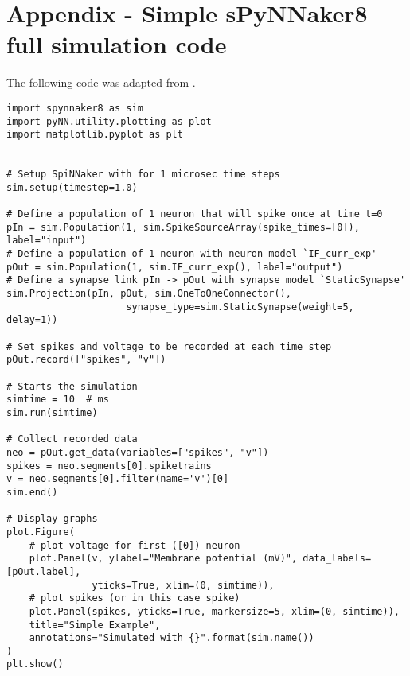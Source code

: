 \appendix
\section{Appendix - Simple sPyNNaker8 full simulation code} \label{app:a}

The following code was adapted from \cite{pynnsim}.

\begin{verbatim}
import spynnaker8 as sim
import pyNN.utility.plotting as plot
import matplotlib.pyplot as plt


# Setup SpiNNaker with for 1 microsec time steps
sim.setup(timestep=1.0)

# Define a population of 1 neuron that will spike once at time t=0
pIn = sim.Population(1, sim.SpikeSourceArray(spike_times=[0]), label="input")
# Define a population of 1 neuron with neuron model `IF_curr_exp'
pOut = sim.Population(1, sim.IF_curr_exp(), label="output")
# Define a synapse link pIn -> pOut with synapse model `StaticSynapse'
sim.Projection(pIn, pOut, sim.OneToOneConnector(),
                     synapse_type=sim.StaticSynapse(weight=5, delay=1))

# Set spikes and voltage to be recorded at each time step
pOut.record(["spikes", "v"])

# Starts the simulation
simtime = 10  # ms
sim.run(simtime)

# Collect recorded data
neo = pOut.get_data(variables=["spikes", "v"])
spikes = neo.segments[0].spiketrains
v = neo.segments[0].filter(name='v')[0]
sim.end()

# Display graphs
plot.Figure(
    # plot voltage for first ([0]) neuron
    plot.Panel(v, ylabel="Membrane potential (mV)", data_labels=[pOut.label],
               yticks=True, xlim=(0, simtime)),
    # plot spikes (or in this case spike)
    plot.Panel(spikes, yticks=True, markersize=5, xlim=(0, simtime)),
    title="Simple Example",
    annotations="Simulated with {}".format(sim.name())
)
plt.show()
\end{verbatim}